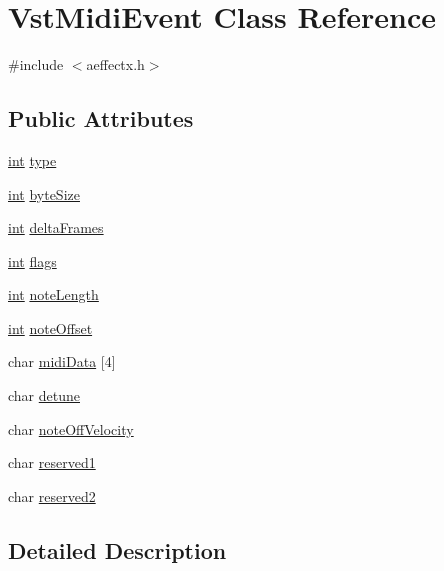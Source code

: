 \hypertarget{class_vst_midi_event}{}\section{Vst\+Midi\+Event Class Reference}
\label{class_vst_midi_event}


{\ttfamily \#include $<$aeffectx.\+h$>$}

\subsection*{Public Attributes}
\begin{DoxyCompactItemize}
\item 
\hyperlink{xmltok_8h_a5a0d4a5641ce434f1d23533f2b2e6653}{int} \hyperlink{class_vst_midi_event_ad8d058890e398849d1569d01137afcb0}{type}
\item 
\hyperlink{xmltok_8h_a5a0d4a5641ce434f1d23533f2b2e6653}{int} \hyperlink{class_vst_midi_event_ae7e599f228fd376cb8a19dc16fb45526}{byte\+Size}
\item 
\hyperlink{xmltok_8h_a5a0d4a5641ce434f1d23533f2b2e6653}{int} \hyperlink{class_vst_midi_event_a9e3e980ea154602b7ad40205b11eb156}{delta\+Frames}
\item 
\hyperlink{xmltok_8h_a5a0d4a5641ce434f1d23533f2b2e6653}{int} \hyperlink{class_vst_midi_event_a956b59b1d71141d3b01392fcfc07edc3}{flags}
\item 
\hyperlink{xmltok_8h_a5a0d4a5641ce434f1d23533f2b2e6653}{int} \hyperlink{class_vst_midi_event_a7136c3f09bbacfc1b555b935be7de673}{note\+Length}
\item 
\hyperlink{xmltok_8h_a5a0d4a5641ce434f1d23533f2b2e6653}{int} \hyperlink{class_vst_midi_event_adfec66cba88a281f5dc440708d7793ff}{note\+Offset}
\item 
char \hyperlink{class_vst_midi_event_a41ed861e773854a165eff6cfcdfd046b}{midi\+Data} \mbox{[}4\mbox{]}
\item 
char \hyperlink{class_vst_midi_event_af2123571b8c0a2d763ae005581583cd7}{detune}
\item 
char \hyperlink{class_vst_midi_event_a64496ffbdd2c8c261042cd1d7b107438}{note\+Off\+Velocity}
\item 
char \hyperlink{class_vst_midi_event_a1e5ad2e468a403f0203039f88a0a9a47}{reserved1}
\item 
char \hyperlink{class_vst_midi_event_a94af5f8e5bb4a2bf11dc67f809f5680f}{reserved2}
\end{DoxyCompactItemize}


\subsection{Detailed Description}


